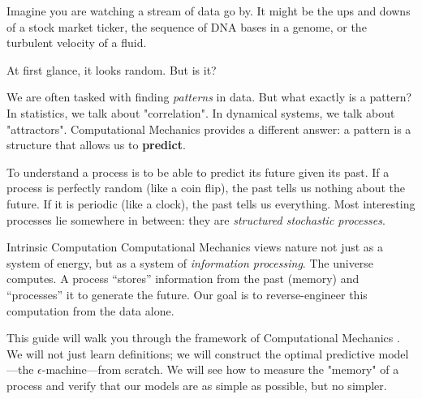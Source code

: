 Imagine you are watching a stream of data go by. It might be the ups and downs of a stock market ticker, the sequence of DNA bases in a genome, or the turbulent velocity of a fluid.

At first glance, it looks random. But is it?

We are often tasked with finding \textit{patterns} in data. But what exactly is a pattern? In statistics, we talk about "correlation". In dynamical systems, we talk about "attractors". Computational Mechanics provides a different answer: a pattern is a structure that allows us to \textbf{predict}.

To understand a process is to be able to predict its future given its past. If a process is perfectly random (like a coin flip), the past tells us nothing about the future. If it is periodic (like a clock), the past tells us everything. Most interesting processes lie somewhere in between: they are \textit{structured stochastic processes}.

\begin{sidebar}{Intrinsic Computation}
Computational Mechanics views nature not just as a system of energy, but as a system of \textit{information processing}. The universe computes. A process ``stores'' information from the past (memory) and ``processes'' it to generate the future. Our goal is to reverse-engineer this computation from the data alone.
\end{sidebar}

This guide will walk you through the framework of Computational Mechanics \cite{shalizi2000computational}. We will not just learn definitions; we will construct the optimal predictive model---the $\epsilon$-machine---from scratch. We will see how to measure the "memory" of a process and verify that our models are as simple as possible, but no simpler.
